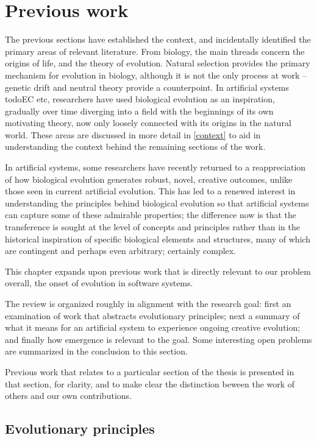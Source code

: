 \section{Previous work}
The previous sections have established the context, and incidentally identified the primary areas of relevant literature. From biology, the main threads concern the origins of life, and the theory of evolution. Natural selection provides the primary mechanism for evolution in biology, although it is not the only process at work -- genetic drift \cite{XXX} and neutral theory \cite{Kimura} provide a counterpoint. In artificial systems \\todo{EC etc}, researchers have used biological evolution as an inspiration, gradually over time diverging into a field with the beginnings of its own motivating theory, now only loosely connected with its origins in the natural world. These areas are discussed in more detail in \ref{context} to aid in understanding the context behind the remaining sections of the work.

In artificial systems, some researchers have recently returned to a reappreciation of how biological evolution generates robust, novel, creative outcomes, unlike those seen in current artificial evolution. This has led to a renewed interest in understanding the principles behind biological evolution so that artificial systems can capture some of these admirable properties; the difference now is that the transference is sought at the level of concepts and principles rather than in the historical inspiration of specific biological elements and structures, many of which are contingent and perhaps even arbitrary; certainly complex.

This chapter expands upon previous work that is directly relevant to our problem overall, the onset of evolution in software systems. 

The review is organized roughly in alignment with the research goal: first an examination of work that abstracts evolutionary principles; next a summary of what it means for an artificial system to experience ongoing creative evolution; and finally how emergence is relevant to the goal. Some interesting open problems are summarized in the conclusion to this section.

Previous work that relates to a particular section of the thesis is presented in that section, for clarity, and to make clear the distinction beween the work of others and our own contributions.

\subsection{Evolutionary principles}
